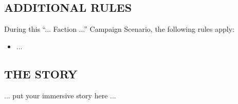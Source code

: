 \begin{multicols*}{2}
\subsection*{\MakeUppercase{Additional Rules}}

During this ``... Faction ...'' Campaign Scenario, the following rules apply:

\begin{itemize}
  \item ...
\end{itemize}

\end{multicols*}

\newpage



\newpage

\begin{multicols*}{2}

\subsection*{\MakeUppercase{The Story}}

... put your immersive story here ...

\end{multicols*}
